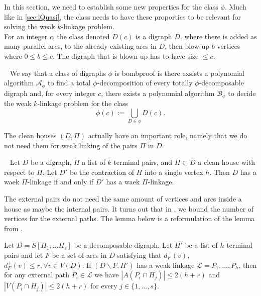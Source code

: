 In this section, we need to establish some new properties for the class $\phi$. 
Much like in \autoref{sec:lQuasi}, the class needs to have these proporties to be relevant for solving the weak $k$-linkage problem.\\ 
For an integer $c$, the class denoted $D(c)$ is a digraph $D$, where there is added as many parallel arcs, to the already existing arcs in $D$, then blow-up $b$ vertices where $0\leq b\leq c$. 
The digraph that is blown up has to have size $\leq c$. 

\begin{definition}~\cite{bangJGT85}
    We say that a class of digraphs $\phi$ is bombproof is there exsists a polynomial algorithm $\mathcal{A}_{\phi}$ to find a total $\phi$-decomposition of every totally $\phi$-decomposable digraph and, for every integer $c$, there exists a polynomial algorithm  $\mathcal{B}_{\phi}$ to decide the weak $k$-linkage problem for the class
    \begin{equation}
        \phi(c):=\bigcup_{D\in \phi}D(c). 
    \end{equation}
    \label{def:bombproof}
\end{definition}
The clean houses $(D,\Pi)$ actually have an important role, namely that we do not need them for weak linking of the pairs $\Pi$ in $D$.
\begin{lemma}~\cite{bangJGT85}
    Let $D$ be a digraph, $\Pi$ a list of $k$ terminal pairs, and $H\subset D$ a clean house with respect to $\Pi$. Let $D'$ be the contraction of $H$ into a single vertex $h$. Then $D$ has a waek $\Pi$-linkage if and only if $D'$ has a waek $\Pi$-linkage.  
    \label{lemma:cleanhouse}
\end{lemma}
The external pairs do not need the same amount of vertices and arcs inside a house as maybe the internal pairs. It turns out that in \cite{bangJGT77}, we bound the number of vertices for the external paths. The lemma below is a reformulation of the lemma from \cite{bangJGT77}. 
\begin{lemma}
    Let $D=S[H_1,\dots H_s]$ be a decomposable digraph. 
    Let $\Pi '$ be a list of $h$ terminal pairs and let $F$ be a set of arcs in $D$ satisfying that $d^-_F(v)$, $d^+_F(v)\leq r, \forall v\in V(D)$.
    If $(D\backslash F , \Pi')$ has a weak linkage $\mathcal{L}=P_1,\dots ,P_h$, then for any external path $P_i\in \mathcal{L}$ we have $|A(P_i\cap H_j)|\leq 2(h+r)$ and $|V(P_i\cap H_j)|\leq 2(h+r)$ for every $j\in \lbrace 1,\dots ,s\rbrace$.
    \label{lemma:external}
\end{lemma}

